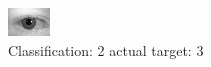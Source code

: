 \begin{figure}[h!]
\begin{center}
\includegraphics[width=0.60\columnwidth]{figures/ID569_class_2_target_3.png}
\end{center}
\caption{ Classification: 2 actual target: 3}
\label{fig:ID569_class_2_target_3}
\end{figure}
